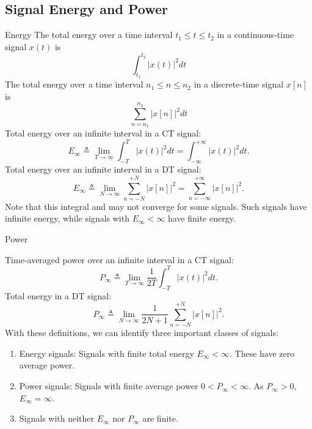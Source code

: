 \subsection{Signal Energy and Power}

\begin{frame}[allowframebreaks]{Energy}
    The total energy over a time interval $t_1 \leq t \leq t_2$ in a continuous-time signal $x(t)$ is
    \begin{equation*}
        \int_{t_1}^{t_2}|x(t)|^2dt
    \end{equation*}
    The total energy over a time interval $n_1 \leq n \leq n_2$ in a discrete-time signal $x[n]$ is
    \begin{equation*}
        \sum_{n= n_1}^{n_2}|x[n]|^2dt
    \end{equation*}
    Total energy  over an infinite interval in a CT signal:
    \begin{equation}
        E_\infty \triangleq \lim_{T \rightarrow \infty} \int_{-T}^{T}|x(t)|^2dt =  \int_{-\infty}^{+\infty}|x(t)|^2dt.
    \end{equation}
    Total energy  over an infinite interval in a DT signal:
    \begin{equation}
      E_\infty \triangleq \lim_{N \rightarrow \infty} \sum_{n = -N}^{+N}|x[n]|^2 =  \sum_{n=-\infty}^{+\infty}|x[n]|^2.
    \end{equation}
    Note that this integral and may not converge for some signals. Such signals have infinite energy, while signals with $E_\infty < \infty$ have finite energy.
\end{frame}


\begin{frame}{Power}

    Time-averaged power over an infinite interval in a CT signal:
    \begin{equation}
        P_\infty \triangleq \lim_{T \rightarrow \infty} \frac{1}{2T}\int_{-T}^{T}|x(t)|^2dt.
    \end{equation}
    Total energy in a DT signal:
    \begin{equation}
      P_\infty \triangleq \lim_{N \rightarrow \infty} \frac{1}{2N+1}\sum_{n = -N}^{+N}|x[n]|^2.
    \end{equation}
    With these definitions, we can identify three important classes of signals:
    {
    \begin{enumerate}
        \item Energy signals: Signals with finite total energy $E_\infty < \infty$. These have zero average power.
        \item Power signals: Signals with finite average power $0 < P_\infty < \infty$. As $P_\infty > 0$, $E_\infty = \infty$.
        \item Signals with neither $E_\infty$ nor $P_\infty$ are finite.
    \end{enumerate}
    }
\end{frame} 